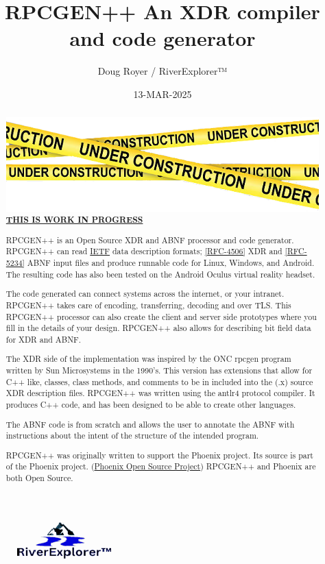 \documentclass[2pt]{article}
\author{Doug Royer / RiverExplorer™}
\date{13-MAR-2025}
\title{RPCGEN++ An XDR compiler and code generator}
\begin{document}
\maketitle
\begin{figure}
  \centering
  \includegraphics{RiverExplorerLLC-Logo-BLACK-131x50-Transparent.ps.png}
\end{figure}
  
\begin{abstract}

  \includegraphics{UnderConstruction.png}
  \underline{\textbf{THIS IS WORK IN PROGRESS}}
  
  RPCGEN++ is an Open Source XDR and ABNF processor and code generator.
  RPCGEN++ can read \href{https://ietf.org}{IETF} data description
  formats;
  \href{https://datatracker.ietf.org/doc/html/rfc4506}{[RFC-4506]}
  XDR and \href{https://datatracker.ietf.org/doc/html/rfc5234}{[RFC-5234]}
  ABNF input files and produce runnable code for Linux, Windows,
  and Android. The resulting code has also been tested on the Android
  Oculus virtual reality headset.

  The code generated can connect systems across the internet,
  or your intranet.
  RPCGEN++ takes care of encoding, transferring, decoding and over
  TLS. This RPCGEN++ processor can also create the client and server side
  prototypes where you fill in the details of your design.
  RPCGEN++ also allows for describing bit field data for XDR and ABNF.
  
  The XDR side of the implementation was inspired by the ONC
  rpcgen program written by Sun Microsystems
  in the 1990's.
  This version has extensions that allow for C++ like, classes, class
  methods, and comments to be in included into the (.x) source XDR
  description files. RPCGEN++ was written using the antlr4 protocol
  compiler. It produces C++ code, and has been designed to be able
  to create other languages.

  The ABNF code is from scratch and allows the user to annotate
  the ABNF with instructions about the intent of the structure
  of the intended program.
  
  RPCGEN++ was originally written to support the Phoenix project.
  Its source is part of the Phoenix project.
  (\href{https://github.com/RiverExplorer/Phoenix}{Phoenix Open Source Project})
  RPCGEN++ and Phoenix are both Open Source.
\end{abstract}
\end{document}
